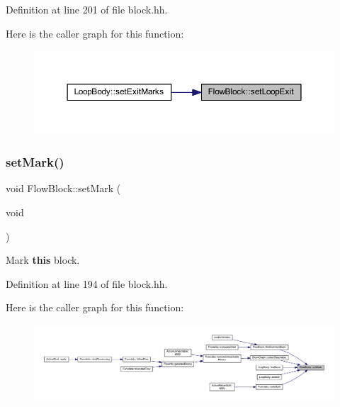 Definition at line 201 of file block.\+hh.

Here is the caller graph for this function\+:
\nopagebreak
\begin{figure}[H]
\begin{center}
\leavevmode
\includegraphics[width=350pt]{class_flow_block_a147b6b67590b45995925e08d6b77bd6e_icgraph}
\end{center}
\end{figure}
\mbox{\label{class_flow_block_a3a64aa8a8182a65f5e1e361d23ecc3c8}} 
\subsubsection{\texorpdfstring{setMark()}{setMark()}}
{\footnotesize\ttfamily void Flow\+Block\+::set\+Mark (\begin{DoxyParamCaption}\item[{void}]{ }\end{DoxyParamCaption})\hspace{0.3cm}{\ttfamily [inline]}}



Mark {\bfseries{this}} block. 



Definition at line 194 of file block.\+hh.

Here is the caller graph for this function\+:
\nopagebreak
\begin{figure}[H]
\begin{center}
\leavevmode
\includegraphics[width=350pt]{class_flow_block_a3a64aa8a8182a65f5e1e361d23ecc3c8_icgraph}
\end{center}
\end{figure}
\mbox{\label{class_flow_block_a55c52137e9aff59348f026f17d9801f0}} 
